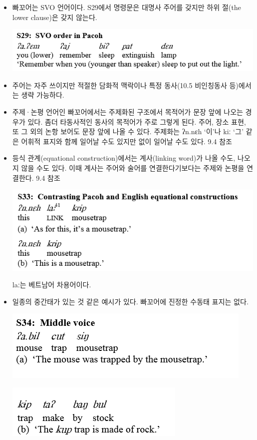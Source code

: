 \begin{itemize}
\item 빠꼬어는 SVO 언어이다. S29에서 명령문은 대명사 주어를 갖지만 하위 절(the lower clause)은 갖지 않는다.

\includegraphics{Pacoh/src/PacohS29.png}

\item 주어는 자주 쓰이지만 적절한 담화적 맥락이나 특정 동사(10.5 비인칭동사 등)에서는 생략 가능하다.

\item 주제·논평 언어인 빠꼬어에서는 주제화된 구조에서 목적어가 문장 앞에 나오는 경우가 있다. 좀더 타동사적인 동사의 목적어가 주로 그렇게 된다. 주어, 장소 표현, 또 그 외의 논항 보어도 문장 앞에 나올 수 있다. 주제화는 ʔn.nɛh `이'나 kiː `그' 같은 어휘적 표지와 함께 일어날 수도 있지만 없이 일어날 수도 있다.  9.4 참조
\item 등식 관계(equational construction)에서는 계사(linking word)가 나올 수도, 나오지 않을 수도 있다. 이때 계사는 주어와 술어를 연결한다기보다는 주제와 논평을 연결한다. 9.4 참조

\includegraphics{Pacoh/src/PacohS33.png}

laː는 베트남어 차용어이다.
\item 일종의 중간태가 있는 것 같은 예시가 있다. 빠꼬어에 진정한 수동태 표지는 없다.

\includegraphics{Pacoh/src/PacohS34-1.png}

\includegraphics{Pacoh/src/PacohS34-2.png}


\end{itemize}
